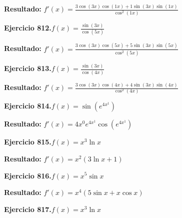 \documentclass[10pt,a4paper]{article}
\begin{document}
\begin{solbox}
\textbf{Resultado:} \(\displaystyle f'(x) = \frac{3\cos(3x)\cos(1x) + 1\sin(3x)\sin(1x)}{\cos^2(1x)}\)
\end{solbox}

\begin{ejbox}
\textbf{Ejercicio 812.}\quad $f(x) = \frac{\sin(3x)}{\cos(5x)}$
\end{ejbox}

\begin{solbox}
\textbf{Resultado:} \(\displaystyle f'(x) = \frac{3\cos(3x)\cos(5x) + 5\sin(3x)\sin(5x)}{\cos^2(5x)}\)
\end{solbox}

\begin{ejbox}
\textbf{Ejercicio 813.}\quad $f(x) = \frac{\sin(3x)}{\cos(4x)}$
\end{ejbox}

\begin{solbox}
\textbf{Resultado:} \(\displaystyle f'(x) = \frac{3\cos(3x)\cos(4x) + 4\sin(3x)\sin(4x)}{\cos^2(4x)}\)
\end{solbox}

\newpage
\begin{ejbox}
\textbf{Ejercicio 814.}\quad $f(x) = \sin(e^{4x^{1}})$
\end{ejbox}

\begin{solbox}
\textbf{Resultado:} \(\displaystyle f'(x) = 4x^{0}e^{4x^{1}}\cos(e^{4x^{1}})\)
\end{solbox}

\begin{ejbox}
\textbf{Ejercicio 815.}\quad $f(x) = x^{3} \ln x$
\end{ejbox}

\begin{solbox}
\textbf{Resultado:} \(\displaystyle f'(x) = x^{2}(3\ln x + 1)\)
\end{solbox}

\begin{ejbox}
\textbf{Ejercicio 816.}\quad $f(x) = x^{5} \sin x$
\end{ejbox}

\begin{solbox}
\textbf{Resultado:} \(\displaystyle f'(x) = x^{4}(5\sin x + x\cos x)\)
\end{solbox}

\newpage
\begin{ejbox}
\textbf{Ejercicio 817.}\quad $f(x) = x^{3} \ln x$
\end{ejbox}
\end{document}
